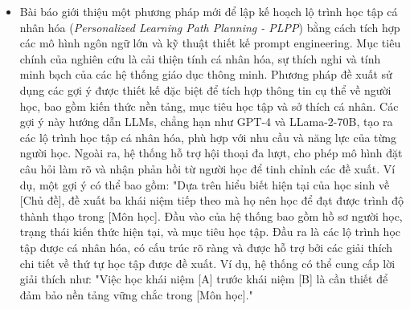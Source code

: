 \begin{itemize}
    \item Bài báo \cite{ng2024educationalpersonalizedlearningpath} giới thiệu một phương pháp mới để lập kế hoạch lộ trình học tập cá nhân hóa (\textit{Personalized Learning Path Planning - PLPP}) bằng cách tích hợp các mô hình ngôn ngữ lớn  và kỹ thuật thiết kế prompt engineering. Mục tiêu chính của nghiên cứu là cải thiện tính cá nhân hóa, sự thích nghi và tính minh bạch của các hệ thống giáo dục thông minh. Phương pháp đề xuất sử dụng các gợi ý được thiết kế đặc biệt để tích hợp thông tin cụ thể về người học, bao gồm kiến thức nền tảng, mục tiêu học tập và sở thích cá nhân. Các gợi ý này hướng dẫn LLMs, chẳng hạn như GPT-4 và LLama-2-70B, tạo ra các lộ trình học tập cá nhân hóa, phù hợp với nhu cầu và năng lực của từng người học. Ngoài ra, hệ thống hỗ trợ hội thoại đa lượt, cho phép mô hình đặt câu hỏi làm rõ và nhận phản hồi từ người học để tinh chỉnh các đề xuất. Ví dụ, một gợi ý có thể bao gồm: "Dựa trên hiểu biết hiện tại của học sinh về [Chủ đề], đề xuất ba khái niệm tiếp theo mà họ nên học để đạt được trình độ thành thạo trong [Môn học]. Đầu vào của hệ thống bao gồm hồ sơ người học, trạng thái kiến thức hiện tại, và mục tiêu học tập. Đầu ra là các lộ trình học tập được cá nhân hóa, có cấu trúc rõ ràng và được hỗ trợ bởi các giải thích chi tiết về thứ tự học tập được đề xuất. Ví dụ, hệ thống có thể cung cấp lời giải thích như: "Việc học khái niệm [A] trước khái niệm [B] là cần thiết để đảm bảo nền tảng vững chắc trong [Môn học]."
\end{itemize}
